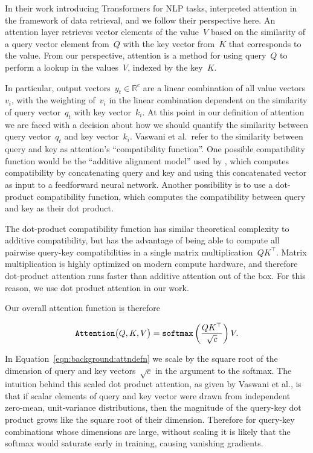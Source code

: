 In their work introducing Transformers for NLP tasks,
\citet{vaswani2017attention} interpreted attention in the framework of data
retrieval, and we follow their perspective here.
An attention layer retrieves vector elements of the value~$V$ based on the
similarity of a query vector element from~$Q$ with the key vector from~$K$ that
corresponds to the value.
From our perspective, attention is a method for using query~$Q$ to perform a
lookup in the values~$V$, indexed by the key~$K$.

In particular, output vectors~$y_t \in \mathbb{R}^c$ are a linear combination
of all value vectors~$v_i$, with the weighting of~$v_i$ in the linear
combination dependent on the similarity of query vector~$q_t$ with key
vector~$k_i$.
At this point in our definition of attention we are faced with a decision about
how we should quantify the similarity between query vector~$q_t$ and key
vector~$k_i$.
Vaswani et al.\ refer to the similarity between query and key as attention's
``compatibility function''.
One possible compatibility function would be the ``additive alignment model''
used by \citet{bahdanau2015neuralmt}, which computes
compatibility by concatenating query and key and using this concatenated vector
as input to a feedforward neural network.
Another possibility is to use a dot-product compatibility function, which
computes the compatibility between query and key as their dot product.

The dot-product compatibility function has similar theoretical complexity to
additive compatibility, but has the advantage of being able to compute all
pairwise query-key compatibilities in a single matrix
multiplication~$QK^\top$.
Matrix multiplication is highly optimized on modern compute hardware, and
therefore dot-product attention runs faster than additive attention out of the
box.
For this reason, we use dot product attention in our work.

Our overall attention function is therefore

\begin{equation}
\mathtt{Attention}\big(Q, K, V\big) = \mathtt{softmax}{}\left(\frac{QK^\top}{\sqrt{c}}\right) V.
\label{eqn:background:attndefn}
\end{equation}

In Equation~\ref{eqn:background:attndefn} we scale by the square root of the
dimension of query and key vectors~$\sqrt{c}$ in the argument to the softmax.
The intuition behind this scaled dot product attention, as given by Vaswani et
al., is that if scalar elements of query and key vector were drawn from
independent zero-mean, unit-variance distributions, then the magnitude of the
query-key dot product grows like the square root of their dimension.
Therefore for query-key combinations whose dimensions are large, without
scaling it is likely that the softmax would saturate early in training, causing
vanishing gradients.


